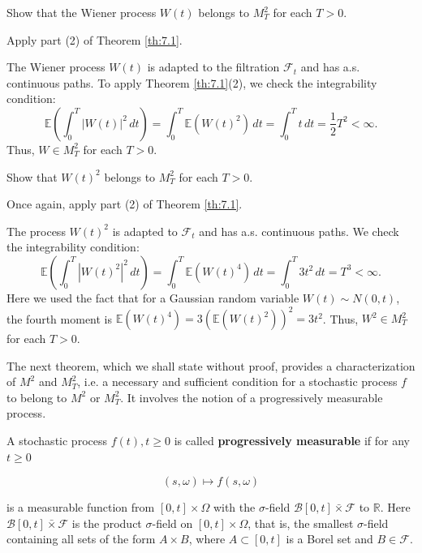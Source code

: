 \begin{Exercise}
\label{ex:7.6}
Show that the Wiener process $W(t)$ belongs to $M_T^2$ for each $T > 0$.

\begin{hint}
Apply part (2) of Theorem \ref{th:7.1}.
\end{hint}
\end{Exercise}

\begin{Solution}
The Wiener process $W(t)$ is adapted to the filtration $\mathcal{F}_t$ and has a.s. continuous paths. To apply Theorem \ref{th:7.1}(2), we check the integrability condition:
\begin{equation*}
\mathbb{E}\left(\int_0^T |W(t)|^2 \, dt\right) = \int_0^T \mathbb{E}(W(t)^2) \, dt = \int_0^T t \, dt = \frac{1}{2} T^2 < \infty.
\end{equation*}
Thus, $W \in M_T^2$ for each $T > 0$.
\end{Solution}

\begin{Exercise}
\label{ex:7.7}
Show that $W(t)^2$ belongs to $M_T^2$ for each $T > 0$.

\begin{hint}
Once again, apply part (2) of Theorem \ref{th:7.1}.
\end{hint}
\end{Exercise}

\begin{Solution}
The process $W(t)^2$ is adapted to $\mathcal{F}_t$ and has a.s. continuous paths. We check the integrability condition:
\begin{equation*}
\mathbb{E}\left(\int_0^T |W(t)^2|^2 \, dt\right) = \int_0^T \mathbb{E}(W(t)^4) \, dt = \int_0^T 3t^2 \, dt = T^3 < \infty.
\end{equation*}
Here we used the fact that for a Gaussian random variable $W(t) \sim N(0, t)$, the fourth moment is $\mathbb{E}(W(t)^4) = 3(\mathbb{E}(W(t)^2))^2 = 3t^2$.
Thus, $W^2 \in M_T^2$ for each $T > 0$.
\end{Solution}

The next theorem, which we shall state without proof, provides a characterization of $M^2$ and $M_T^2$, i.e. a necessary and sufficient condition for a stochastic process $f$ to belong to $M^2$ or $M_T^2$. It involves the notion of a progressively measurable process.

\begin{Definition}
\label{def:7.6}
A stochastic process $f(t), t \geq 0$ is called \textbf{progressively measurable} if for any $t \geq 0$

\begin{equation}
(s, \omega) \mapsto f(s, \omega)
\end{equation}

is a measurable function from $[0, t] \times \Omega$ with the $\sigma$-field $\mathcal{B}[0, t] \bar{\times} \mathcal{F}$ to $\mathbb{R}$. Here $\mathcal{B}[0, t] \bar{\times} \mathcal{F}$ is the product $\sigma$-field on $[0, t] \times \Omega$, that is, the smallest $\sigma$-field containing all sets of the form $A \times B$, where $A \subset [0, t]$ is a Borel set and $B \in \mathcal{F}$.
\end{Definition}

